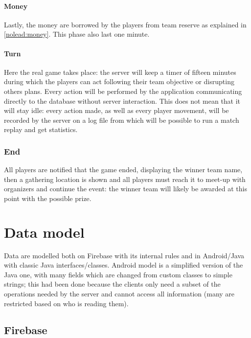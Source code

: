 			\paragraph{Money}
				
				Lastly, the money are borrowed by the players from team reserve as explained in \autoref{nolead:money}.
				This phase also last one minute.
							
			\paragraph{Turn}
			
				Here the real game takes place: the server will keep a timer of fifteen minutes during which the players can act following their team objective or disrupting others plans.
				Every action will be performed by the application communicating directly to the database without server interaction. This does not mean that it will stay idle: every action made, as well as every player movement, will be recorded by the server on a log file from which will be possible to run a match replay and get statistics.
			
		\subsubsection{End}
		
			All players are notified that the game ended, displaying the winner team name, then a gathering location is shown and all players must reach it to meet-up with organizers and continue the event: the winner team will likely be awarded at this point with the possible prize.
			
	\section{Data model}	
		
		Data are modelled both on Firebase with its internal rules and in Android/Java with classic Java interfaces/classes.
		Android model is a simplified version of the Java one, with many fields which are changed from custom classes to simple strings; this had been done because the clients only need a subset of the operations needed by the server and cannot access all information (many are restricted based on who is reading them).
		
		\subsection{Firebase}
			
